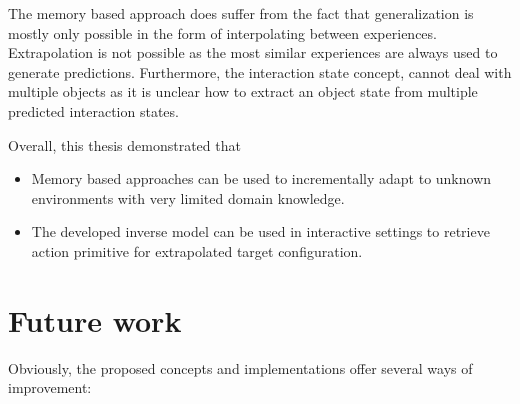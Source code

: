 The memory based approach does suffer from the fact that generalization is mostly only possible in the form of interpolating between experiences. Extrapolation is not possible as the most similar experiences are always used to generate predictions.
Furthermore, the interaction state concept, cannot deal with multiple objects as it is unclear how to extract an object state from multiple predicted interaction states.

Overall, this thesis demonstrated that 

\begin{itemize}
\item Memory based approaches can be used to incrementally adapt to unknown environments with very limited domain knowledge.
\item The developed inverse model can be used in interactive settings to retrieve action primitive for extrapolated target configuration.
\end{itemize} 


\section{Future work}

Obviously, the proposed concepts and implementations offer several ways of improvement:

